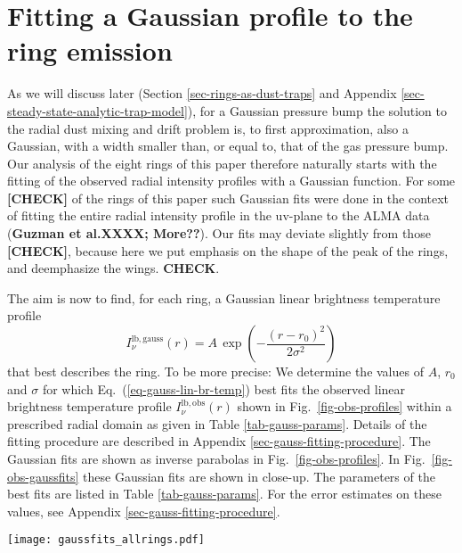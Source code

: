 \documentclass{aa}
\begin{document}
\section{Fitting a Gaussian profile to the ring emission}
\label{sec-gauss-fits}
%
As we will discuss later (Section \ref{sec-rings-as-dust-traps} and Appendix
\ref{sec-steady-state-analytic-trap-model}), for a
Gaussian pressure bump the solution to the radial dust mixing and drift problem
is, to first approximation, also a Gaussian, with a width smaller than, or equal
to, that of the gas pressure bump. Our analysis of the eight rings of this paper
therefore naturally starts with the fitting of the observed radial intensity
profiles with a Gaussian function. For some {\bf [CHECK]} of the rings of this
paper such Gaussian fits were done in the context of fitting the entire radial
intensity profile in the uv-plane to the ALMA data ({\bf Guzman et al.XXXX;
  More??}). Our fits may deviate slightly from those {\bf [CHECK]}, because here
we put emphasis on the shape of the peak of the rings, and deemphasize the
wings. {\bf CHECK}.

The aim is now to find, for each ring, a Gaussian linear brightness temperature
profile
\begin{equation}\label{eq-gauss-lin-br-temp}
I_{\nu}^{\mathrm{lb,gauss}}(r) = A\,\exp\left(-\frac{(r-r_0)^2}{2\sigma^2}\right)
\end{equation}
that best describes the ring. To be more precise: We determine the values of
$A$, $r_0$ and $\sigma$ for which Eq.~(\ref{eq-gauss-lin-br-temp}) best fits the
observed linear brightness temperature profile $I_{\nu}^{\mathrm{lb,obs}}(r)$
shown in Fig.~\ref{fig-obs-profiles} within a prescribed radial domain as given
in Table \ref{tab-gauss-params}. Details of the fitting procedure are described
in Appendix \ref{sec-gauss-fitting-procedure}. The Gaussian fits are shown as
inverse parabolas in Fig.\ \ref{fig-obs-profiles}. In
Fig.~\ref{fig-obs-gaussfits} these Gaussian fits are shown in close-up. The
parameters of the best fits are listed in Table \ref{tab-gauss-params}.  For the
error estimates on these values, see Appendix \ref{sec-gauss-fitting-procedure}.

\begin{figure*}
\centerline{\texttt{[image: gaussfits\_allrings.pdf]}}
\caption{\label{fig-obs-gaussfits}Gaussian fits to the eight rings of this
  paper. The blue curves are the observations, the orange curves are the best fit
  Gaussian profiles. The ``fit range'' bar shows the radial range within which
  the Gauss was fitted to the data. The fit range was chosen to fit the part of
  the curve that, by eye, most resembles a Gaussian. The ``beam'' bar shows the
  FWHM beam size of the observations. The grey band around the blue curve shows
  the estimated uncertainty of the data.}
\end{figure*}
\end{document}
